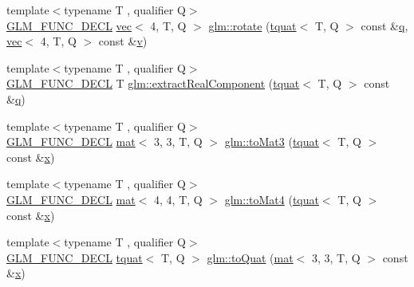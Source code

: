 \begin{DoxyCompactItemize}
\item 
{\footnotesize template$<$typename T , qualifier Q$>$ }\\\mbox{\hyperlink{setup_8hpp_ab2d052de21a70539923e9bcbf6e83a51}{G\+L\+M\+\_\+\+F\+U\+N\+C\+\_\+\+D\+E\+CL}} \mbox{\hyperlink{structglm_1_1vec}{vec}}$<$ 4, T, Q $>$ \mbox{\hyperlink{group__gtx__quaternion_ga97a5f8af1d63056b85a53ac28042fe77}{glm\+::rotate}} (\mbox{\hyperlink{structglm_1_1tquat}{tquat}}$<$ T, Q $>$ const \&\mbox{\hyperlink{_s_d_l__opengl_8h_a8fc1e7b9baaae687804c7eed46ca09c6}{q}}, \mbox{\hyperlink{structglm_1_1vec}{vec}}$<$ 4, T, Q $>$ const \&\mbox{\hyperlink{_s_d_l__opengl_8h_a10a82eabcb59d2fcd74acee063775f90}{v}})
\item 
{\footnotesize template$<$typename T , qualifier Q$>$ }\\\mbox{\hyperlink{setup_8hpp_ab2d052de21a70539923e9bcbf6e83a51}{G\+L\+M\+\_\+\+F\+U\+N\+C\+\_\+\+D\+E\+CL}} T \mbox{\hyperlink{group__gtx__quaternion_ga312385d0a8caa24c1daaa1d00ce4c2d3}{glm\+::extract\+Real\+Component}} (\mbox{\hyperlink{structglm_1_1tquat}{tquat}}$<$ T, Q $>$ const \&\mbox{\hyperlink{_s_d_l__opengl_8h_a8fc1e7b9baaae687804c7eed46ca09c6}{q}})
\item 
{\footnotesize template$<$typename T , qualifier Q$>$ }\\\mbox{\hyperlink{setup_8hpp_ab2d052de21a70539923e9bcbf6e83a51}{G\+L\+M\+\_\+\+F\+U\+N\+C\+\_\+\+D\+E\+CL}} \mbox{\hyperlink{structglm_1_1mat}{mat}}$<$ 3, 3, T, Q $>$ \mbox{\hyperlink{group__gtx__quaternion_ga433955cb703d982427fb53b540d02f3d}{glm\+::to\+Mat3}} (\mbox{\hyperlink{structglm_1_1tquat}{tquat}}$<$ T, Q $>$ const \&\mbox{\hyperlink{_s_d_l__opengl_8h_ad0e63d0edcdbd3d79554076bf309fd47}{x}})
\item 
{\footnotesize template$<$typename T , qualifier Q$>$ }\\\mbox{\hyperlink{setup_8hpp_ab2d052de21a70539923e9bcbf6e83a51}{G\+L\+M\+\_\+\+F\+U\+N\+C\+\_\+\+D\+E\+CL}} \mbox{\hyperlink{structglm_1_1mat}{mat}}$<$ 4, 4, T, Q $>$ \mbox{\hyperlink{group__gtx__quaternion_ga1fa0fb798c2715148e2e0358442bf895}{glm\+::to\+Mat4}} (\mbox{\hyperlink{structglm_1_1tquat}{tquat}}$<$ T, Q $>$ const \&\mbox{\hyperlink{_s_d_l__opengl_8h_ad0e63d0edcdbd3d79554076bf309fd47}{x}})
\item 
{\footnotesize template$<$typename T , qualifier Q$>$ }\\\mbox{\hyperlink{setup_8hpp_ab2d052de21a70539923e9bcbf6e83a51}{G\+L\+M\+\_\+\+F\+U\+N\+C\+\_\+\+D\+E\+CL}} \mbox{\hyperlink{structglm_1_1tquat}{tquat}}$<$ T, Q $>$ \mbox{\hyperlink{group__gtx__quaternion_gae9be791077b7a612d9092a922bd13f86}{glm\+::to\+Quat}} (\mbox{\hyperlink{structglm_1_1mat}{mat}}$<$ 3, 3, T, Q $>$ const \&\mbox{\hyperlink{_s_d_l__opengl_8h_ad0e63d0edcdbd3d79554076bf309fd47}{x}})

\end{DoxyCompactItemize}
